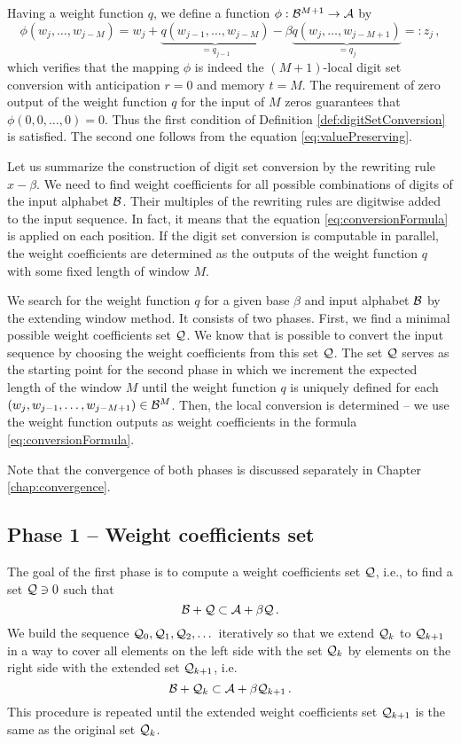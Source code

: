  Having a weight function $q$, we define a function $\phi:\mathcal{B}^{M+1}\rightarrow \mathcal{A}$ by
    \begin{equation}
    \label{eq:localConversion}
        \phi(w_{j}, \dots, w_{j-M})=w_j+ \underbrace{q(w_{j-1}, \dots, w_{j-M})}_{=q_{j-1}} - \beta \underbrace{q(w_j, \dots, w_{j-M+1})}_{=q_j}=:z_j\,,
    \end{equation} 
    which verifies that the mapping $\phi$ is indeed the $(M+1)$-local digit set conversion with anticipation $r=0$ and memory $t=M$. The requirement of zero output of the weight function $q$ for the input of $M$ zeros guarantees that $\phi(0,0,\dots,0)=0$. Thus the first condition of Definition \ref{def:digitSetConversion} is satisfied. The second one follows from the equation \eqref{eq:valuePreserving}. 
    
Let us summarize the construction of digit set conversion by the rewriting rule $x-\beta$. We need to find weight coefficients for all possible combinations of digits of the input alphabet $\mathcal{B}$. Their multiples of the rewriting rules are digitwise added to the input sequence. In fact, it means that the equation  \eqref{eq:conversionFormula} is applied on each position. If the digit set conversion is computable in parallel, the weight coefficients are determined as the outputs of the weight function $q$ with some fixed length of window $M$.  

We search for the weight function $q$ for a given base $\beta$ and input alphabet $\mathcal{B}$ by the extending window method. It consists of two phases. First, we find a minimal possible weight coefficients set $\mathcal{Q}$. We know that is possible to convert the input sequence by choosing the weight coefficients from this set $\mathcal{Q}$. The set $\mathcal{Q}$ serves as the starting point for the second phase in which we increment the expected length of the window $M$ until the weight function $q$ is uniquely defined for each $(w_j,w_{j-1}, \dots , w_{j-M+1}) \in \mathcal{B}^{M}$. Then, the local conversion is determined -- we use the weight function outputs as weight coefficients in the formula \eqref{eq:conversionFormula}.    

Note that the convergence of both phases is discussed separately in Chapter \ref{chap:convergence}.

\subsection{Phase 1 -- Weight coefficients set}
\label{subsec:phase1}
The goal of the first phase is to compute a weight coefficients set $\mathcal{Q}$, i.e., to find a set $\mathcal{Q} \ni 0$ such that 
$$
    \mathcal{B} + \mathcal{Q} \subset \mathcal{A} + \beta \mathcal{Q}\,.
$$  
We build the sequence $\mathcal{Q}_0, \mathcal{Q}_1, \mathcal{Q}_2,\dots$ iteratively so that we extend $\mathcal{Q}_k$ to $\mathcal{Q}_{k+1}$ in a way to cover all elements on the left side with the set $\mathcal{Q}_k$ by elements on the right side with the extended set $\mathcal{Q}_{k+1}$, i.e.
$$
\mathcal{B}+ \mathcal{Q}_k \subset \mathcal{A} + \beta \mathcal{Q}_{k+1}\,.
$$
This procedure is repeated until the extended weight coefficients set $\mathcal{Q}_{k+1}$ is the same as the original set $\mathcal{Q}_{k}$. 


